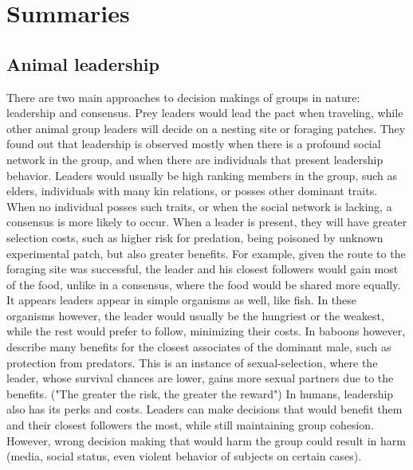 \documentclass[11pt]{article}
\begin{document}
\clearpage
\section{Summaries}
\subsection{Animal leadership \citep{animal_leadership}}
There are two main approaches to decision makings of groups in nature: leadership and consensus. Prey leaders would lead the pact when traveling, while other animal group leaders will decide on a nesting site or foraging patches. They found out that leadership is observed mostly when there is a profound social network in the group, and when there are individuals that present leadership behavior. Leaders would usually be high ranking members in the group, such as elders, individuals with many kin relations, or posses other dominant traits. When no individual posses such traits, or when the social network is lacking, a consensus is more likely to occur.
When a leader is present, they will have greater selection costs, such as higher risk for predation, being poisoned by unknown experimental patch, but also greater benefits. For example, given the route to the foraging site was successful, the leader and his closest followers would gain most of the food, unlike in a consensus, where the food would be shared more equally.
It appears leaders appear in simple organisms as well, like fish. In these organisms however, the leader would usually be the hungriest or the weakest, while the rest would prefer to follow, minimizing their costs. In baboons however, \citet{animal_leadership} describe many benefits for the closest associates of the dominant male, such as protection from predators. This is an instance of sexual-selection, where the leader, whose survival chances are lower, gains more sexual partners due to the benefits. ("The greater the risk, the greater the reward")
In humans, leadership also has its perks and costs. Leaders can make decisions that would benefit them and their closest followers the most, while still maintaining group cohesion. However, wrong decision making that would harm the group could result in harm (media, social status, even violent behavior of subjects on certain cases).
\end{document}
